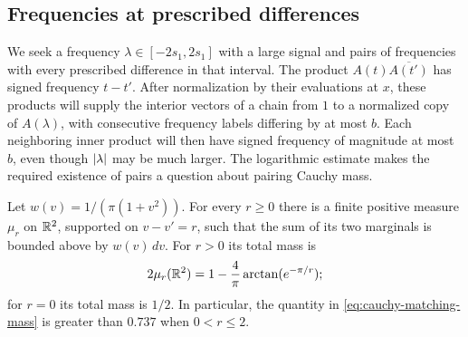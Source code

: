 \subsection{Frequencies at prescribed differences}

We seek a frequency $\lambda\in[-2s_1,2s_1]$ with a large signal and pairs
of frequencies with every prescribed difference in that interval.
The product $A(t)\overline{A(t')}$ has signed frequency $t-t'$.
After normalization by their evaluations at $x$, these products will supply
the interior vectors of a chain from $1$ to a normalized copy of
$A(\lambda)$, with consecutive frequency labels differing by at most $b$.
Each neighboring inner product will then have
signed frequency of magnitude at most $b$, even though $\lvert \lambda\rvert$ may
be much larger.  The logarithmic estimate makes the required existence of
pairs a question about pairing Cauchy mass.

\begin{lemma}\label{lem:cauchy-matching}
Let $w(v)=1/(\pi(1+v^2))$.  For every $r\ge0$ there is a finite positive
measure $\mu_r$ on $\mathbb R^2$, supported on $v-v'=r$, such that the sum of its
two marginals is bounded above by $w(v)\,dv$.  For $r>0$ its total mass is
\begin{equation}\label{eq:cauchy-matching-mass}
 2\mu_r(\mathbb R^2)=1-\frac4\pi\arctan(e^{-\pi/r});
\end{equation}
for $r=0$ its total mass is $1/2$.  In particular, the quantity in
\eqref{eq:cauchy-matching-mass} is greater than $0.737$ when $0<r\le2$.
\end{lemma}

